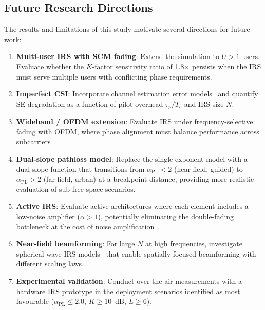 \documentclass[journal]{IEEEtran} %
\begin{document}
\subsection{Future Research Directions}

The results and limitations of this study motivate several directions for future work:

\begin{enumerate}
    \item \textbf{Multi-user IRS with SCM fading}: Extend the simulation to $U > 1$ users. Evaluate whether the $K$-factor sensitivity ratio of 1.8$\times$ persists when the IRS must serve multiple users with conflicting phase requirements.

    \item \textbf{Imperfect CSI}: Incorporate channel estimation error models~\cite{jensen2020irs_estimation} and quantify SE degradation as a function of pilot overhead $\tau_p / T_c$ and IRS size $N$.

    \item \textbf{Wideband / OFDM extension}: Evaluate IRS under frequency-selective fading with OFDM, where phase alignment must balance performance across subcarriers~\cite{zheng2020irs_ofdm}.

    \item \textbf{Dual-slope pathloss model}: Replace the single-exponent model with a dual-slope function that transitions from $\alpha_{\mathrm{PL}} < 2$ (near-field, guided) to $\alpha_{\mathrm{PL}} > 2$ (far-field, urban) at a breakpoint distance, providing more realistic evaluation of sub-free-space scenarios.

    \item \textbf{Active IRS}: Evaluate active architectures where each element includes a low-noise amplifier ($\alpha > 1$), potentially eliminating the double-fading bottleneck at the cost of noise amplification~\cite{zhang2022active_irs}.

    \item \textbf{Near-field beamforming}: For large $N$ at high frequencies, investigate spherical-wave IRS models~\cite{cui2022nearfield} that enable spatially focused beamforming with different scaling laws.

    \item \textbf{Experimental validation}: Conduct over-the-air measurements with a hardware IRS prototype in the deployment scenarios identified as most favourable ($\alpha_{\mathrm{PL}} \leq 2.0$, $K \geq 10$~dB, $L \geq 6$).
\end{enumerate}
\end{document}
